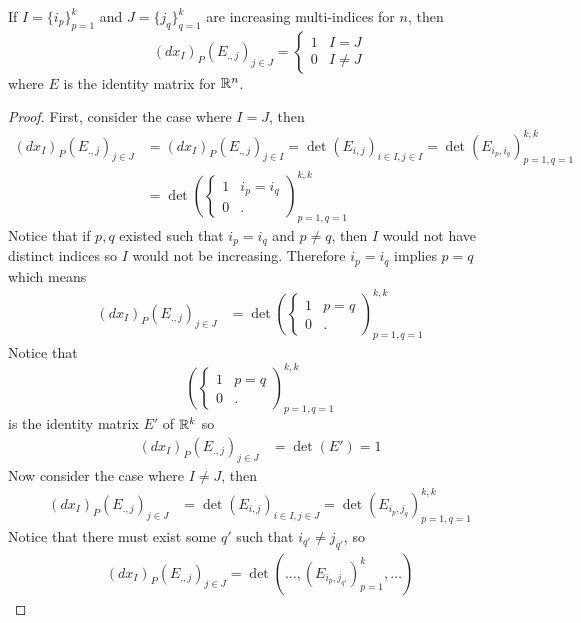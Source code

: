\documentclass[notes]{subfiles}
\begin{document}
\begin{lemma}
    If $I = \{i_p\}_{p = 1}^k$ and $J = \{j_q\}_{q = 1}^k$ are increasing multi-indices for $n$, then
    \[
        (dx_I)_P(E_{., j})_{j \in J} = \begin{cases}
            1 & I = J \\
            0 & I \neq J
        \end{cases}
    \]
    where $E$ is the identity matrix for $\mathbb{R}^n$.
\end{lemma}
\begin{proof}
    First, consider the case where $I = J$, then
    \begin{align*}
        (dx_I)_P(E_{., j})_{j \in J}
        &= (dx_I)_P(E_{., j})_{j \in I}
        = \det(E_{i, j})_{i \in I, j \in I}
        = \det(E_{i_p, i_q})_{p = 1, q = 1}^{k, k} \\
        &= \det\left(\begin{cases}
            1 & i_p = i_q \\
            0 & .
        \end{cases}\right)_{p = 1, q = 1}^{k, k}
    \end{align*}
    Notice that if $p, q$ existed such that $i_p = i_q$ and $p \neq q$, then $I$ would not have distinct indices so $I$ would not be increasing. Therefore $i_p = i_q$ implies $p = q$ which means
    \begin{align*}
        (dx_I)_P(E_{., j})_{j \in J}
        &= \det\left(\begin{cases}
            1 & p = q \\
            0 & .
        \end{cases}\right)_{p = 1, q = 1}^{k, k}
    \end{align*}
    Notice that \[
        \left(\begin{cases}
            1 & p = q \\
            0 & .
        \end{cases}\right)_{p = 1, q = 1}^{k, k}
    \]
    is the identity matrix $E'$ of $\mathbb{R}^k$ so
    \begin{align*}
        (dx_I)_P(E_{., j})_{j \in J}
        &= \det(E')
        = 1
    \end{align*}
    Now consider the case where $I \neq J$, then
    \begin{align*}
        (dx_I)_P(E_{., j})_{j \in J}
        &= \det(E_{i, j})_{i \in I, j \in J}
        = \det(E_{i_p, j_q})_{p = 1, q = 1}^{k, k}
    \end{align*}
    Notice that there must exist some $q'$ such that $i_{q'} \neq j_{q'}$, so
    \begin{align*}
        (dx_I)_P(E_{., j})_{j \in J}
        = \det(\ldots, (E_{i_p, j_{q'}})_{p = 1}^k, \ldots)
    \end{align*}
\end{proof}
\end{document}
